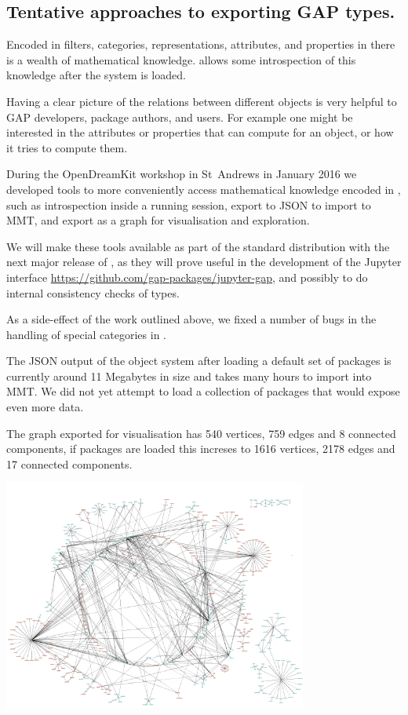 
\subsection{Tentative approaches to exporting GAP types.}\label{gap-types-export}

Encoded in filters, categories, representations, attributes, and properties in \GAP
there is a wealth of mathematical knowledge. \GAP allows some introspection
of this knowledge after the system is loaded.

Having a clear picture of the relations between different objects is 
very helpful to GAP developers, package authors, and users.
For example one might be interested in the attributes or properties that \GAP can
compute for an object, or how it tries to compute them.

During the OpenDreamKit workshop in St~Andrews in January 2016 we developed
tools to more conveniently access mathematical knowledge encoded in \GAP,
such as introspection inside a running \GAP session, export to JSON to import
to MMT, and export as a graph for visualisation and exploration.

We will make these tools available as part of the standard \GAP distribution with the next
major release of \GAP, as they will prove useful in the development of the \GAP Jupyter interface
\url{https://github.com/gap-packages/jupyter-gap}, and possibly to do
internal consistency checks of \GAP types.

As a side-effect of the work outlined above, we fixed a number of bugs in the handling of
special categories in \GAP.

The JSON output of the \GAP object system after loading a default set of packages is currently
around 11 Megabytes in size and takes many hours to import into MMT. We did not yet attempt to
load a collection of \GAP packages that would expose even more data.

The graph exported for visualisation has 540 vertices, 759 edges and 8 connected components, if
packages are loaded this increses to 1616 vertices, 2178 edges and 17 connected components.

\centerline{\includegraphics[width=10cm]{gap-graph.png}}

